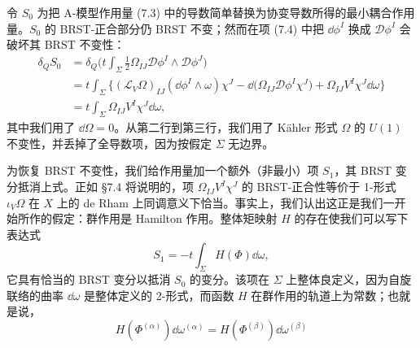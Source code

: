
令 $S_0$ 为把 A-模型作用量 (7.3) 中的导数简单替换为协变导数所得的最小耦合作用量。$S_0$ 的 BRST-正合部分仍 BRST 不变；然而在项 (7.4) 中把 $\dd\phi^I$ 换成 $\mathcal{D}\phi^I$ 会破坏其 BRST 不变性：
\begin{align*}
\delta_QS_0&=\delta_Q\Big(t\int_\Sigma\frac12\Omega_{IJ}\mathcal{D}\phi^I\wedge\mathcal{D}\phi^J\Big)\\
&=t\int_\Sigma\Big\{(\mathcal{L}_V\Omega)_{IJ}(\dd\phi^I\wedge\omega)\chi^J-\dd\big(\Omega_{IJ}\mathcal{D}\phi^I\chi^J\big)+\Omega_{IJ}V^I\chi^J\dd\omega\Big\}\\
&=t\int_\Sigma\Omega_{IJ}V^I\chi^J\dd\omega,
\end{align*}
其中我们用了 $\dd\Omega=0$。从第二行到第三行，我们用了 Kähler 形式 $\Omega$ 的 $U(1)$ 不变性，并丢掉了全导数项，因为按假定 $\Sigma$ 无边界。

为恢复 BRST 不变性，我们给作用量加一个额外（非最小）项 $S_1$，其 BRST 变分抵消上式。正如 §7.4 将说明的，项 $\Omega_{IJ}V^I\chi^J$ 的 BRST-正合性等价于 1-形式 $\iota_V\Omega$ 在 $X$ 上的 de Rham 上同调意义下恰当。事实上，我们认出这正是我们一开始所作的假定：群作用是 Hamilton 作用。整体矩映射 $H$ 的存在使我们可以写下表达式
\[
S_1=-t\int_\Sigma H(\Phi)\dd\omega,
\]
它具有恰当的 BRST 变分以抵消 $S_0$ 的变分。该项在 $\Sigma$ 上整体良定义，因为自旋联络的曲率 $\dd\omega$ 是整体定义的 2-形式，而函数 $H$ 在群作用的轨道上为常数；也就是说，
\[
H(\Phi^{(\alpha)})\dd\omega^{(\alpha)}=H(\Phi^{(\beta)})\dd\omega^{(\beta)}
\]


